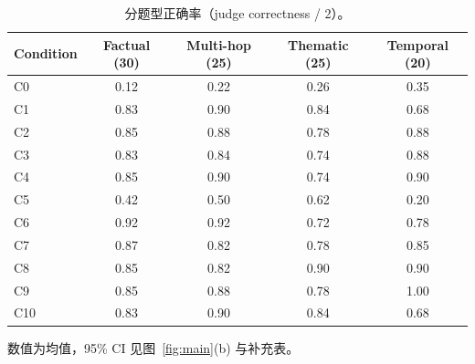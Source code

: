 \begin{table}[H]
\centering
\caption{分题型正确率（judge correctness / 2）。}
\label{tab:types}
\small
\begin{threeparttable}
\begin{tabular}{@{}l cccc@{}}
\toprule
Condition & Factual (30) & Multi-hop (25) & Thematic (25) & Temporal (20) \\
\midrule
C0 & 0.12 & 0.22 & 0.26 & 0.35 \\
C1 & 0.83 & 0.90 & 0.84 & 0.68 \\
C2 & 0.85 & 0.88 & 0.78 & 0.88 \\
C3 & 0.83 & 0.84 & 0.74 & 0.88 \\
C4 & 0.85 & 0.90 & 0.74 & 0.90 \\
C5 & 0.42 & 0.50 & 0.62 & 0.20 \\
C6 & 0.92 & 0.92 & 0.72 & 0.78 \\
C7 & 0.87 & 0.82 & 0.78 & 0.85 \\
C8 & 0.85 & 0.82 & 0.90 & 0.90 \\
C9 & 0.85 & 0.88 & 0.78 & 1.00 \\
C10 & 0.83 & 0.90 & 0.84 & 0.68 \\
\bottomrule
\end{tabular}
\begin{tablenotes}\scriptsize
\item 数值为均值，95\% CI 见图~\ref{fig:main}(b) 与补充表。
\end{tablenotes}
\end{threeparttable}
\end{table}

